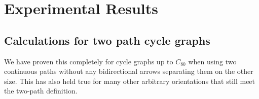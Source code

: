 \documentclass[11pt,reqno]{amsart}
\theoremstyle{definition}
\theoremstyle{plain}
\begin{document}
\section{Experimental Results}

	\subsection{Calculations for two path cycle graphs}
		We have proven this completely for cycle graphs up to $C_{80}$ when using two continuous paths without
		any bidirectional arrows separating them on the other size.  This has also held true for many other
		arbitrary orientations that still meet the two-path definition.


\end{document}
